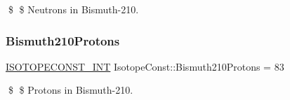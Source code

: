 \$ \$ Neutrons in Bismuth-\/210. \mbox{\label{group___isotope_const-_bismuth-_bi210_ga84abd0d4ef0f642cfef2bca4f3f62541}} 
\subsubsection{\texorpdfstring{Bismuth210\+Protons}{Bismuth210Protons}}
{\footnotesize\ttfamily \mbox{\hyperlink{group___isotope_const-_macros_ga5f18360b3e99483a35c32d789e62621c}{I\+S\+O\+T\+O\+P\+E\+C\+O\+N\+S\+T\+\_\+\+I\+NT}} Isotope\+Const\+::\+Bismuth210\+Protons = 83}

\$ \$ Protons in Bismuth-\/210. 